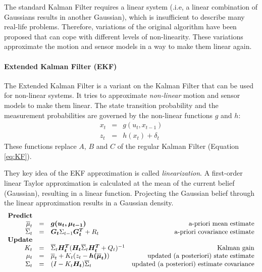 The standard Kalman Filter requires a linear system (.i.e, a linear combination of Gaussians results in another Gaussian), which is insufficient to describe many real-life problems.
Therefore, variations of the original algorithm have been proposed that can cope with different levels of non-linearity.
These variations approximate the motion and sensor models in a way to make them linear again.

\paragraph{Extended Kalman Filter (EKF)}
The Extended Kalman Filter is a variant on the Kalman Filter that can be used for non-linear systems.
It tries to approximate \textit{non-linear} motion and sensor models to make them linear.
The state transition probability and the measurement probabilities are governed by the non-linear functions $g$ and $h$:
\begin{equation}
\begin{array}{rcl}
x_t & = & g(u_t, x_{t-1}) \\
z_t & = & h(x_t) + \delta_t
\end{array}
\end{equation}
These functions replace $A$, $B$ and $C$ of the regular Kalman Filter (Equation \ref{eq:KF}).

They key idea of the EKF approximation is called \textit{linearization}.
A first-order linear Taylor approximation is calculated at the mean of the current belief (Gaussian), resulting in a linear function.
Projecting the Gaussian belief through the linear approximation results in a Gaussian density.
\begin{equation}
\begin{array}{rclr}
\text{\textbf{Predict}} \\
\overline{\mu}_t & = & \boldsymbol{g(u_t, \mu_{t-1})} & \text{a-priori mean estimate} \\
\overline{\Sigma}_t & = & \boldsymbol{G_t} \Sigma_{t-1} \boldsymbol{G_t^T} + R_t  & \text{a-priori covariance estimate} \\
\text{\textbf{Update}} \\
K_t & = & \overline{\Sigma}_t \boldsymbol{H_t^T} (\boldsymbol{H_t} \overline{\Sigma}_t \boldsymbol{H_t^T} + Q_t)^{-1} & \text{Kalman gain} \\
\mu_t & = & \overline{\mu}_t + K_t(z_t - \boldsymbol{h(\overline{\mu}_t)}) & \text{updated (a posteriori) state estimate} \\
\Sigma_t & = & (I - K_t \boldsymbol{H_t}) \overline{\Sigma}_t & \text{updated (a posteriori) estimate covariance}
\end{array}
\end{equation}

